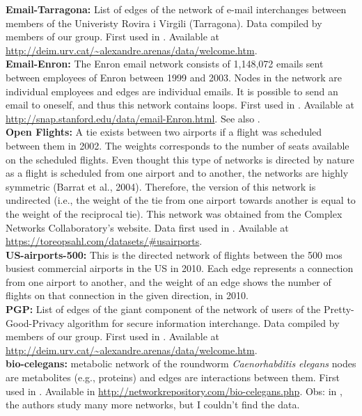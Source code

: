 \documentclass{article}
\begin{document}
\textbf{Email-Tarragona:} List of edges of the network of e-mail interchanges between members of the Univeristy Rovira i Virgili (Tarragona). Data compiled by members of our group. First used in \cite{Guimera2003Self-similarInteractions}. Available at \url{http://deim.urv.cat/~alexandre.arenas/data/welcome.htm}.
\\

\textbf{Email-Enron:} The Enron email network consists of 1,148,072 emails sent between employees of Enron between 1999 and 2003. Nodes in the network are individual employees and edges are individual emails. It is possible to send an email to oneself, and thus this network contains loops. First used in \cite{leskovec2009}. Available at \url{http://snap.stanford.edu/data/email-Enron.html}. See also \cite{konect:2017:enron,konect:klimt04}.
\\

\textbf{Open Flights:} A tie exists between two airports if a flight was scheduled between them in 2002. The weights corresponds to the number of seats available on the scheduled flights. Even thought this type of networks is directed by nature as a flight is scheduled from one airport and to another, the networks are highly symmetric (Barrat et al., 2004). Therefore, the version of this network is undirected (i.e., the weight of the tie from one airport towards another is equal to the weight of the reciprocal tie). This network was obtained from the Complex Networks Collaboratory’s website. Data first used in \cite{Colizza2007Reaction-diffusionNetworks}. Available at \url{https://toreopsahl.com/datasets/#usairports}.
\\

\textbf{US-airports-500:} This is the directed network of flights between the 500 mos busiest commercial airports in the US in 2010. Each edge represents a connection from one airport to another, and the weight of an edge shows the number of flights on that connection in the given direction, in 2010.
\\

\textbf{PGP:} List of edges of the giant component of the network of users of the Pretty-Good-Privacy algorithm for secure information interchange. Data compiled by members of our group. First used in \cite{Boguna2004ModelsAttachment}. Available at \url{http://deim.urv.cat/~alexandre.arenas/data/welcome.htm}.
\\


\textbf{bio-celegans:} metabolic network of the roundworm \emph{Caenorhabditis elegans} nodes are metabolites (e.g., proteins) and edges are interactions between them. First used in \cite{Jeong2000TheNetworks}. Available in \url{http://networkrepository.com/bio-celegans.php}. Obs: in  \cite{Jeong2000TheNetworks}, the authors study many more networks, but I couldn't find the data.
\\
\end{document}
